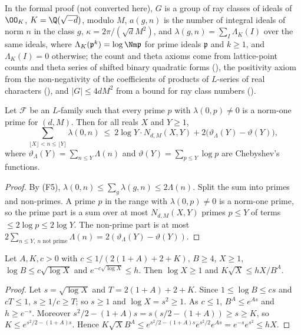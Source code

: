 In the formal proof (not converted here), $G$ is a group of ray classes of ideals of $\OO_K$, $K=\Q(\sqrt{-d})$, modulo $M$, $a(g,n)$ is the
number of integral ideals of norm $n$ in the class $g$, $\kappa=2\pi/(\sqrt dM^2)$, and $\lambda(g,n)=\sum_I\Lambda_K(I)$ over the same ideals, where
$\Lambda_K(\mathfrak p^k)=\log\Nm\mathfrak p$ for prime ideals $\mathfrak p$ and $k\ge1$, and $\Lambda_K(I)=0$ otherwise; the
count and theta axioms come from lattice-point counts and theta series of shifted binary quadratic forms
(), the positivity axiom from the non-negativity of the coefficients of products of $L$-series of real
characters (), and $|G|\le4dM^2$ from a bound for ray class numbers
().

\begin{lemma}\label{pf:sh-misc:lamnorm}
Let $\mathcal F$ be an $L$-family such that every prime $p$ with $\lambda(0,p)\ne0$ is a norm-one prime for $(d,M)$. Then for all reals $X$ and
$Y\ge1$,
\[
\sum_{\lfloor X\rfloor<n\le\lfloor Y\rfloor}\lambda(0,n)\ \le\ 2\log Y\cdot N_{d,M}(X,Y)+2\bigl(\vartheta_\Lambda(Y)-\vartheta(Y)\bigr),
\]
where $\vartheta_\Lambda(Y)=\sum_{n\le Y}\Lambda(n)$ and $\vartheta(Y)=\sum_{p\le Y}\log p$ are Chebyshev's functions.
\end{lemma}

\begin{proof}
By (F5), $\lambda(0,n)\le\sum_g\lambda(g,n)\le2\Lambda(n)$. Split the sum into primes and non-primes. A prime $p$ in the range with
$\lambda(0,p)\ne0$ is a norm-one prime, so the prime part is a sum over at most $N_{d,M}(X,Y)$ primes $p\le Y$ of terms $\le2\log p\le2\log Y$. The
non-prime part is at most $2\sum_{n\le Y,\ n\text{ not prime}}\Lambda(n)=2(\vartheta_\Lambda(Y)-\vartheta(Y))$.
\end{proof}

\begin{lemma}\label{pf:sh-misc:sqrtle}
Let $A,K,c>0$ with $c\le1/(2(1+A)+2+K)$, $B\ge4$, $X\ge1$, $\log B\le c\sqrt{\log X}$ and $e^{-c\sqrt{\log X}}\le h$. Then $\log X\ge1$ and
$K\sqrt X\le hX/B^A$.
\end{lemma}

\begin{proof}
Let $s=\sqrt{\log X}$ and $T=2(1+A)+2+K$. Since $1\le\log B\le cs$ and $cT\le1$, $s\ge1/c\ge T$; so $s\ge1$ and $\log X=s^2\ge1$. As $c\le1$,
$B^A\le e^{As}$ and $h\ge e^{-s}$. Moreover $s^2/2-(1+A)s=s(s/2-(1+A))\ge s\ge K$, so $K\le e^{s^2/2-(1+A)s}$. Hence
$K\sqrt XB^A\le e^{s^2/2-(1+A)s}e^{s^2/2}e^{As}=e^{-s}e^{s^2}\le hX$.
\end{proof}

